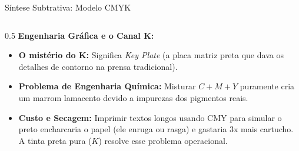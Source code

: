 \begin{frame}{Síntese Subtrativa: Modelo CMYK}
{\begin{columns}[T]
            \begin{column}{0.5\textwidth}    
                \scriptsize
                \textbf{Engenharia Gráfica e o Canal K:}
                \begin{itemize}
                    \setlength{\itemsep}{1pt}
                    \item \textbf{O mistério do K:} Significa \textit{Key Plate} (a placa matriz preta que dava os detalhes de contorno na prensa tradicional).
                    \item \textbf{Problema de Engenharia Química:} Misturar $C+M+Y$ puramente cria um marrom lamacento devido a impurezas dos pigmentos reais.
                    \item \textbf{Custo e Secagem:} Imprimir textos longos usando CMY para simular o preto encharcaria o papel (ele enruga ou rasga) e gastaria 3x mais cartucho. A tinta preta pura ($K$) resolve esse problema operacional.
                \end{itemize}
            \end{column}
        \end{columns}
    }
\end{frame}

